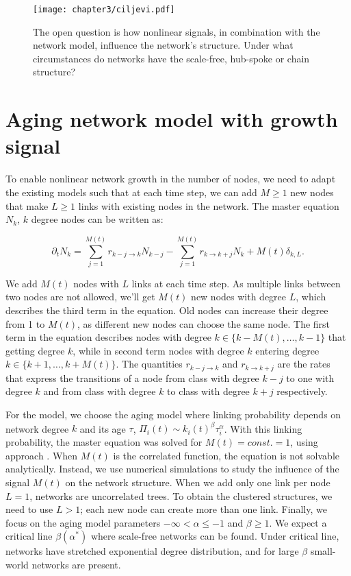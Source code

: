 \begin{figure}[!ht]
	\centering
	\texttt{[image: chapter3/ciljevi.pdf]}
	\caption[Nonlinear growth of the network.]{The open question is how nonlinear signals, in combination with the network model, influence the network's structure. Under what circumstances do networks have the scale-free, hub-spoke or chain structure? }
	\label{fig:ciljevi}
\end{figure}

\section{Aging network model with growth signal}

To enable nonlinear network growth in the number of nodes, we need to adapt the existing models such that at each time step, we can add $M\geq1$ new nodes that make $L\geq1$ links with existing nodes in the network. The master equation $N_k$, $k$ degree nodes can be written as: 

\begin{equation}
\partial_{t}N_{k}=\sum^{M(t)}_{j=1}r_{k-j\longrightarrow k}N_{k-j}-\sum^{M(t)}_{j=1}r_{k\longrightarrow k+j}N_{k}+M(t)\delta_{k,L} . \label{eq:aging_master}  
\end{equation}

We add $M(t)$ nodes with $L$ links at each time step. As multiple links between two nodes are not allowed, we'll get $M(t)$ new nodes with degree $L$, which describes the third term in the equation. Old nodes can increase their degree from 1 to $M(t)$, as different new nodes can choose the same node. The first term in the equation describes nodes with degree $k\in\{k-M(t),\ldots, k-1\}$ that getting degree $k$, while in second term nodes with degree $k$ entering degree  $k\in\{k+1,\ldots, k+M(t)\}$. The quantities $r_{k-j\longrightarrow k}$ and $r_{k\longrightarrow k+j}$ are the rates that express the transitions of a node from class with degree $k-j$ to one with degree $k$ and from class with degree $k$ to class with degree $k+j$ respectively.  

For the model, we choose the aging model where linking probability depends on network degree $k$ and its age $\tau$, $\Pi_{i}(t)\sim k_{i}(t)^{\beta}\tau_{i}^{\alpha}$. With this linking probability, the master equation was solved for $M(t)=const.=1$, using approach \cite{dorogovtsev2001b}. When $M(t)$ is the correlated function, the equation is not solvable analytically. Instead, we use numerical simulations to study the influence of the signal $M(t)$ on the network structure. When we add only one link per node $L=1$, networks are uncorrelated trees. To obtain the clustered structures, we need to use $L>1$; each new node can create more than one link. Finally, we focus on the aging model parameters $-\infty<\alpha\leq-1$ and $\beta\geq1$. We expect a critical line $\beta(\alpha^{*})$ where scale-free networks can be found. Under critical line, networks have stretched exponential degree distribution, and for large $\beta$ small-world networks are present. 

